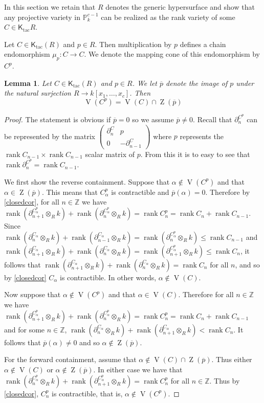 \documentclass{amsart}[11pt]
\newcommand{\rank}{\operatorname{rank}}
\newcommand{\V}{\operatorname{V}}
\newcommand{\Z}{\operatorname{Z}}
\newcommand{\Ktac}{\operatorname{\mathsf{K}_{tac}}\nolimits}
\numberwithin{equation}{section}
\theoremstyle{plain}
\newtheorem*{Main Theorem}{Main Theorem}
\newtheorem{lemma}[theorem]{Lemma}
\theoremstyle{definition}
\theoremstyle{remark}
\numberwithin{equation}{theorem}
\begin{document}
In this section we retain that $R$ denotes the generic hypersurface and show that any projective variety in 
$\mathbb P^{c-1}_k$ can be realized as the rank variety of some $C\in\Ktac R$.  

Let $C\in\Ktac(R)$ and 
$p\in R$.  Then multiplication by $p$ defines a chain endomorphism $\mu_p:C\to C$.  We denote the mapping cone of this endomorphism by $C^p$.

\begin{lemma}\label{lemma} Let $C\in\Ktac(R)$ and $p\in R$.  We let $\overline p$ denote the image of $p$ under the natural surjection $R\to k[x_1,\dots,x_c]$. Then
\[
\V(C^p)=\V(C)\cap\Z(\overline p)
\]
\end{lemma} 

\begin{proof} The statement is obvious if $\overline p=0$ so we assume $\overline p\ne 0$. Recall that $\partial_n^{C^p}$ can be represented by the matrix
$\left(\begin{array}{cc} \partial_n^C & p\\ 0 & -\partial_{n-1}^C \end{array}\right)$
where $p$ represents the $\rank C_{n-1}\times\rank C_{n-1}$ scalar matrix of $p$. From this it
is to easy to see that $\rank\partial^{C^p}_n=\rank C_{n-1}$.

We first show the reverse containment. Suppose that $\alpha\notin \V(C^p)$ and that 
$\alpha\in\Z(\overline p)$. This means that $C^p_\alpha$ is contractible and 
$\overline p(\alpha)=0$. Therefore by \ref{closedcor}, for all $n\in\mathbb Z$ we have 
$\rank(\partial^{C^p_\alpha}_{n+1}\otimes_Rk)+\rank(\partial^{C^p_\alpha}_n\otimes_Rk)=
\rank C^p_n=\rank C_n+\rank C_{n-1}$. Since $\rank(\partial^{C_\alpha}_n\otimes_Rk)+
\rank(\partial^{C_\alpha}_{n-1}\otimes_Rk)=\rank(\partial^{C^p_\alpha}_n\otimes_Rk)\le\rank C_{n-1}$ and $\rank(\partial^{C_\alpha}_{n+1}\otimes_Rk)+
\rank(\partial^{C_\alpha}_n\otimes_Rk)=\rank(\partial^{C^p_\alpha}_{n+1}\otimes_Rk)\le\rank C_n$, it follows that  
$\rank(\partial^{C_\alpha}_{n+1}\otimes_Rk)+
\rank(\partial^{C_\alpha}_n\otimes_Rk)=\rank C_n$ for all $n$, and so by \ref{closedcor} $C_\alpha$ is contractible. In other words, $\alpha\notin\V(C)$.

Now suppose that $\alpha\notin \V(C^p)$ and that $\alpha\in\V(C)$. Therefore for all $n\in\mathbb Z$ we have $\rank(\partial^{C^p_\alpha}_{n+1}\otimes_Rk)+\rank(\partial^{C^p_\alpha}_n\otimes_Rk)=
\rank C^p_n=\rank C_n+\rank C_{n-1}$ and for some $n\in\mathbb Z$, 
$\rank(\partial^{C_\alpha}_n\otimes_R k)+\rank(\partial^{C_\alpha}_{n+1}\otimes_Rk)<\rank C_n$.
It follows that $\overline p(\alpha)\ne 0$ and so $\alpha\notin\Z(\overline p)$.

For the forward containment, assume that $\alpha\notin\V(C)\cap\Z(\overline p)$.  Thus either
$\alpha\notin\V(C)$ or $\alpha\notin\Z(\overline p)$. In either case we have that 
$\rank(\partial^{C^p_\alpha}_n\otimes_Rk)+\rank(\partial^{C^p_\alpha}_{n+1}\otimes_Rk)=\rank C^p_n$ for all $n\in\mathbb Z$. Thus by \ref{closedcor}, $C^p_n$ is contractible, that is, 
$\alpha\notin\V(C^p)$.
\end{proof}
\end{document}
